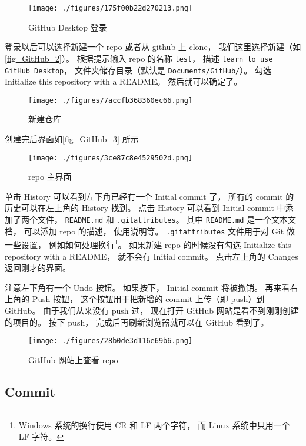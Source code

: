 \begin{figure}[ht]
\centering
\texttt{[image: ./figures/175f00b22d270213.png]}
\caption{GitHub Desktop 登录} \label{fig_GitHub_1}
\end{figure}

登录以后可以选择新建一个 repo 或者从 github 上 clone， 我们这里选择新建（如\autoref{fig_GitHub_2}）。 根据提示输入 repo 的名称 \verb|test|， 描述 \verb|learn to use GitHub Desktop|， 文件夹储存目录（默认是 \verb|Documents/GitHub/|）。 勾选 Initialize this repository with a README。 然后就可以确定了。

\begin{figure}[ht]
\centering
\texttt{[image: ./figures/7accfb368360ec66.png]}
\caption{新建仓库} \label{fig_GitHub_2}
\end{figure}

创建完后界面如\autoref{fig_GitHub_3} 所示
\begin{figure}[ht]
\centering
\texttt{[image: ./figures/3ce87c8e4529502d.png]}
\caption{repo 主界面} \label{fig_GitHub_3}
\end{figure}

单击 History 可以看到左下角已经有一个 Initial commit 了， 所有的 commit 的历史可以在左上角的 History 找到。 点击 History 可以看到 Initial commit 中添加了两个文件， \verb|README.md| 和 \verb|.gitattributes|。 其中 \verb|README.md| 是一个文本文档， 可以添加 repo 的描述， 使用说明等。 \verb|.gitattributes| 文件用于对 Git 做一些设置， 例如如何处理换行\footnote{Windows 系统的换行使用 CR 和 LF 两个字符， 而 Linux 系统中只用一个 LF 字符。}。 如果新建 repo 的时候没有勾选 Initialize this repository with a README， 就不会有 Initial commit。 点击左上角的 Changes 返回刚才的界面。

注意左下角有一个 Undo 按钮。 如果按下， Initial commit 将被撤销。 再来看右上角的 Push 按钮， 这个按钮用于把新增的 commit 上传（即 push）到 GitHub。 由于我们从来没有 push 过， 现在打开 GitHub 网站是看不到刚刚创建的项目的。 按下 push， 完成后再刷新浏览器就可以在 GitHub 看到了。
\begin{figure}[ht]
\centering
\texttt{[image: ./figures/28b0de3d116e69b6.png]}
\caption{GitHub 网站上查看 repo} \label{fig_GitHub_5}
\end{figure}

\subsection{Commit}
